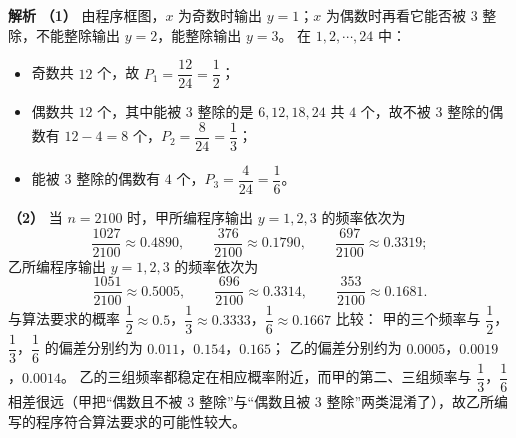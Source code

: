 \begin{answer}
\textbf{解析}
\textbf{（1）} 由程序框图，$x$ 为奇数时输出 $y=1$；$x$ 为偶数时再看它能否被 $3$ 整除，不能整除输出 $y=2$，能整除输出 $y=3$。
在 $1,2,\cdots,24$ 中：
\begin{itemize}
\item 奇数共 $12$ 个，故 $P_1=\dfrac{12}{24}=\dfrac12$；
\item 偶数共 $12$ 个，其中能被 $3$ 整除的是 $6,12,18,24$ 共 $4$ 个，故不被 $3$ 整除的偶数有 $12-4=8$ 个，$P_2=\dfrac8{24}=\dfrac13$；
\item 能被 $3$ 整除的偶数有 $4$ 个，$P_3=\dfrac4{24}=\dfrac16$。
\end{itemize}
\textbf{（2）} 当 $n=2100$ 时，甲所编程序输出 $y=1,2,3$ 的频率依次为
\nopagebreak[4]
\[\frac{1027}{2100}\approx0.4890,\qquad\frac{376}{2100}\approx0.1790,\qquad\frac{697}{2100}\approx0.3319;\]
乙所编程序输出 $y=1,2,3$ 的频率依次为
\nopagebreak[4]
\[\frac{1051}{2100}\approx0.5005,\qquad\frac{696}{2100}\approx0.3314,\qquad\frac{353}{2100}\approx0.1681.\]
与算法要求的概率 $\dfrac12\approx0.5$，$\dfrac13\approx0.3333$，$\dfrac16\approx0.1667$ 比较：
甲的三个频率与 $\dfrac12$，$\dfrac13$，$\dfrac16$ 的偏差分别约为 $0.011$，$0.154$，$0.165$；
乙的偏差分别约为 $0.0005$，$0.0019$，$0.0014$。
乙的三组频率都稳定在相应概率附近，而甲的第二、三组频率与 $\dfrac13$，$\dfrac16$ 相差很远（甲把“偶数且不被 $3$ 整除”与“偶数且被 $3$ 整除”两类混淆了），故乙所编写的程序符合算法要求的可能性较大。



\end{answer}
